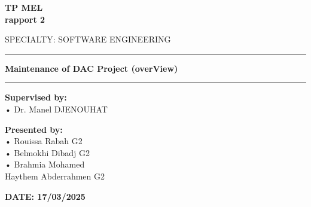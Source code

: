 \documentclass[12pt,a4paper]{article}
\begin{document}
\begin{titlepage}
\begin{minipage}{0.15\textwidth}
    \end{minipage}
    
    \vspace{3cm}

    \begin{center}
        \LARGE{\textbf{TP MEL \\ rapport 2}}
    \end{center}

    \vspace{0.1cm}

    \begin{center}
        SPECIALTY: SOFTWARE ENGINEERING
    \end{center}
    
    \vspace{1.9cm}
    \hrule
    \vspace{0.5cm}

    \begin{center}
        \LARGE{\textbf{Maintenance of DAC Project (overView)}}
    \end{center}
    
    \vspace{0.5cm}
    \hrule
    \vspace{2cm}
    
    \begin{minipage}[t]{0.66\textwidth}
        \textbf{Supervised by:}\\
        • Dr. Manel DJENOUHAT
    \end{minipage}
    \hfill
    \begin{minipage}[t]{0.4\textwidth}
        \textbf{Presented by:}\\
        • Rouissa Rabah G2\\
        • Belmokhi Dibadj G2\\
        • Brahmia Mohamed\\Haythem Abderrahmen G2
    \end{minipage}

    \vspace{5cm}

    \begin{center}
        \large\textbf{DATE: 17/03/2025}
    \end{center}
\end{titlepage}

\thispagestyle{empty}
\tableofcontents
\newpage
\thispagestyle{empty}
\listoftables
\newpage
\thispagestyle{empty}
\listoffigures
\newpage
{}
\end{document}
